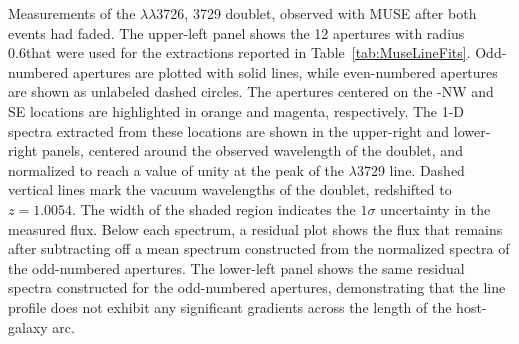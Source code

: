 \label{fig:MUSEOIISequence}
Measurements of the  $\lambda\lambda$3726, 3729
doublet, observed with MUSE after both \spock events had faded.  The
upper-left panel shows the 12 apertures with radius 0.6\arcsec that
were used for the extractions reported in
Table~\ref{tab:MuseLineFits}.  Odd-numbered apertures are plotted with
solid lines, while even-numbered apertures are shown as unlabeled
dashed circles.  The apertures centered on the \spock-NW and SE
locations are highlighted in orange and magenta, respectively.  The
1-D spectra extracted from these \spock locations are shown in the
upper-right and lower-right panels, centered around the observed
wavelength of the  doublet, and normalized to reach a
value of unity at the peak of the $\lambda$3729 line.  Dashed vertical
lines mark the vacuum wavelengths of the doublet, redshifted to
$z=1.0054$. The width of the shaded region indicates the $1\sigma$
uncertainty in the measured flux.  Below each spectrum, a residual
plot shows the flux that remains after subtracting off a mean spectrum
constructed from the normalized spectra of the odd-numbered apertures.
The lower-left panel shows the same residual spectra constructed for
the odd-numbered apertures, demonstrating that the 
line profile does not exhibit any significant gradients across the
length of the host-galaxy arc.

